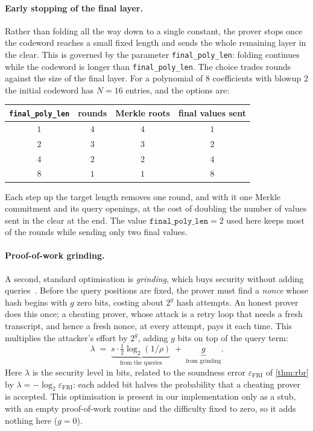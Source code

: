 \paragraph{Early stopping of the final layer.}
Rather than folding all the way down to a single constant, the prover
stops once the codeword reaches a small fixed length and sends the whole
remaining layer in the clear. This is governed by the parameter
\texttt{final\_poly\_len}: folding continues while the codeword is longer
than \texttt{final\_poly\_len}. The choice trades rounds against the size of
the final layer. For a polynomial of $8$ coefficients with blowup $2$
the initial codeword has $N = 16$ entries, and the options are:
%
\begin{center}
\begin{tabular}{cccc}
\hline
\texttt{final\_poly\_len} & rounds & Merkle roots & final values sent \\
\hline
$1$ & $4$ & $4$ & $1$ \\
$2$ & $3$ & $3$ & $2$ \\
$4$ & $2$ & $2$ & $4$ \\
$8$ & $1$ & $1$ & $8$ \\
\hline
\end{tabular}
\end{center}
%
Each step up the target length removes one round, and with it one Merkle
commitment and its query openings, at the cost of doubling the number of
values sent in the clear at the end. The value $\texttt{final\_poly\_len}
= 2$ used here keeps most of the rounds while sending only two final
values.

\paragraph{Proof-of-work grinding.}
A second, standard optimisation is \emph{grinding}, which buys security
without adding queries~\cite[Section~3.11.3]{ethSTARK}. Before the query
positions are fixed, the prover must find a \emph{nonce} whose hash begins
with $g$ zero bits, costing about $2^{g}$ hash attempts. An honest prover
does this once; a cheating prover, whose attack is a retry loop that needs
a fresh transcript, and hence a fresh nonce, at every attempt, pays it
each time. This multiplies the attacker's effort by $2^{g}$, adding $g$
bits on top of the query term:
%
\begin{equation}
\label{eq:security_with_grinding}
\lambda \;=\; \underbrace{s \cdot \tfrac{1}{2}\log_2(1/\rho)}_{\text{from the queries}}
\;+\; \underbrace{g}_{\text{from grinding}} .
\end{equation}
%
Here $\lambda$ is the security level in bits, related to the soundness
error $\varepsilon_{\mathrm{FRI}}$ of \cref{thm:rbr} by
$\lambda = -\log_2 \varepsilon_{\mathrm{FRI}}$: each added bit halves the
probability that a cheating prover is accepted.
This optimisation is present in our implementation only as a stub, with an
empty proof-of-work routine and the difficulty fixed to zero, so it adds
nothing here ($g = 0$).


